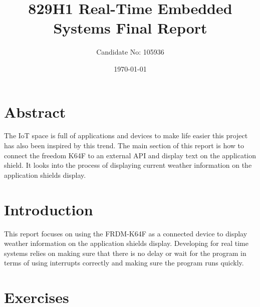\documentclass[a4paper,12pt]{scrartcl}
\title{829H1 Real-Time Embedded Systems Final Report}
\author{Candidate No: 105936}
\date{\today}
\begin{document}
	
	\begin{titlepage}
		\maketitle
	\end{titlepage}
	
	\tableofcontents
	\newpage

	\section{Abstract}
	{
		The IoT space is full of applications and devices to make life easier this project has also been inspired by this trend. The main section of this report is how to connect the freedom K64F\cite{nxpproducts2014} to an external API and display text on the application shield. It looks into the process of displaying current weather information on the application shields display.
	}

	\section{Introduction}
	{
		This report focuses on using the FRDM-K64F\cite{nxpproducts2014} as a connected device to display weather information on the application shields display. Developing for real time systems relies on making sure that there is no delay or wait for the program in terms of using interrupts correctly and making sure the program runs quickly.
	}
	
	\section{Exercises}
	{
	}
\end{document}
